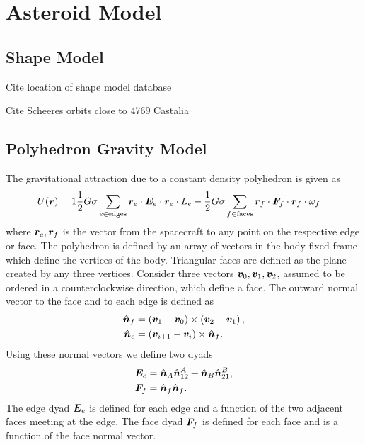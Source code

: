 \documentclass[]{aiaa-tc}%
\begin{document}
\section{Asteroid Model}

\subsection{Shape Model}
Cite location of shape model database

Cite Scheeres orbits close to 4769 Castalia
\subsection{Polyhedron Gravity Model}

The gravitational attraction due to a constant density polyhedron is given as
\begin{align*}
	U(\bm{r}) &= 1\frac{1}{2} G \sigma \sum_{e \in \text{edges}} \bm{r}_e \cdot \bm{E}_e \cdot \bm{r}_e \cdot L_e - \frac{1}{2}G \sigma \sum_{f \in \text{faces}} \bm{r}_f \cdot \bm{F}_f \cdot \bm{r}_f \cdot \omega_f 
\end{align*}
where \( \bm{r}_e, \bm{r}_f \) is the vector from the spacecraft to any point on the respective edge or face.
The polyhedron is defined by an array of vectors in the body fixed frame which define the vertices of the body.
Triangular faces are defined as the plane created by any three vertices. 
Consider three vectors \( \bm{v}_0, \bm{v}_1, \bm{v}_2 \), assumed to be ordered in a counterclockwise direction, which define a face. 
The outward normal vector to the face and to each edge is defined as
\begin{align*}
	\hat{\bm{n}}_f &= \left( \bm{v}_{1} - \bm{v}_0 \right) \times \left( \bm{v}_{2} - \bm{v}_1 \right) ,\\
	\hat{\bm{n}}_{e} &= \left( \bm{v}_{i+1} - \bm{v}_i \right) \times \hat{\bm{n}}_f .
\end{align*}
Using these normal vectors we define two dyads
\begin{align*}
	\bm{E}_e &= \hat{\bm{n}}_A \hat{\bm{n}}_{12}^A + \hat{\bm{n}}_B \hat{\bm{n}}_{21}^B ,\\
	\bm{F}_f &= \hat{\bm{n}}_f \hat{\bm{n}}_f .
\end{align*}
The edge dyad \( \bm{E}_e \) is defined for each edge and a function of the two adjacent faces meeting at the edge. 
The face dyad \( \bm{F}_f \) is defined for each face and is a function of the face normal vector.
\end{document}
